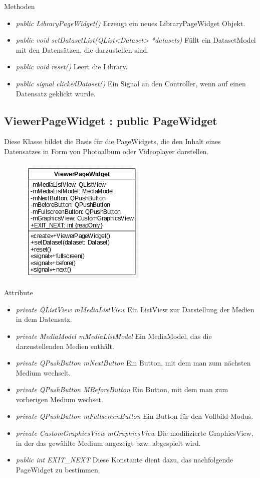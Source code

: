 Methoden
\begin{itemize}
	\item\textit{public LibraryPageWidget()} 
	Erzeugt ein neues LibraryPageWidget Objekt.
	\item\textit{public void setDatasetList(QList<Dataset> *datasets)} 
	Füllt ein DatasetModel mit den Datensätzen, die darzustellen sind.
	\item\textit{public void reset()} 
	Leert die Library.
	\item\textit{public signal clickedDataset()} 
	Ein Signal an den Controller, wenn auf einen Datensatz geklickt wurde.
\end{itemize}

\subsection*{ViewerPageWidget : public PageWidget}
Diese Klasse bildet die Basis für die PageWidgets, die den Inhalt eines Datensatzes in Form von Photoalbum oder Videoplayer darstellen.

\begin{figure}[H]
	\centering
	\includegraphics[scale=0.5]{img/Klassendiagramm/Klassen/View/ViewerPageWidget}
	\label{fig:viewerPageWidget}
\end{figure}

Attribute
\begin{itemize}
	\item\textit{private QListView mMediaListView}
	Ein ListView zur Darstellung der Medien in dem Datensatz.
	\item\textit{private MediaModel mMediaListModel} 
	Ein MediaModel, das die darzustellenden Medien enthält.
	\item\textit{private QPushButton mNextButton}
	Ein Button, mit dem man zum nächsten Medium wechselt. 
	\item\textit{private QPushButton MBeforeButton}
	Ein Button, mit dem man zum vorherigen Medium wechset.
	\item\textit{private QPushButton mFullscreenButton}
	Ein Button für den Vollbild-Modus.
	\item\textit{private CustomGraphicsView mGraphicsView} 
	Die modifizierte GraphicsView, in der das gewählte Medium angezeigt bzw. abgespielt wird.  
	\item\textit{public int EXIT\_NEXT} 
	Diese Konstante dient dazu, das nachfolgende PageWidget zu bestimmen.     
\end{itemize}

